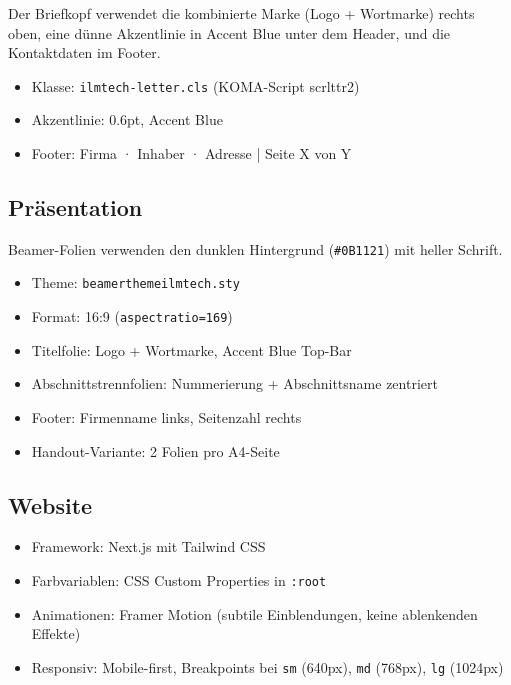 \documentclass[a4paper, 11pt]{article}
\begin{document}
Der Briefkopf verwendet die kombinierte Marke (Logo + Wortmarke) rechts oben, eine dünne
Akzentlinie in Accent Blue unter dem Header, und die Kontaktdaten im Footer.

\begin{itemize}[leftmargin=2em]
  \item Klasse: \texttt{ilmtech-letter.cls} (KOMA-Script scrlttr2)
  \item Akzentlinie: 0.6pt, Accent Blue
  \item Footer: Firma · Inhaber · Adresse | Seite X von Y
\end{itemize}

\subsection{Präsentation}

Beamer-Folien verwenden den dunklen Hintergrund (\texttt{\#0B1121}) mit heller Schrift.

\begin{itemize}[leftmargin=2em]
  \item Theme: \texttt{beamerthemeilmtech.sty}
  \item Format: 16:9 (\texttt{aspectratio=169})
  \item Titelfolie: Logo + Wortmarke, Accent Blue Top-Bar
  \item Abschnittstrennfolien: Nummerierung + Abschnittsname zentriert
  \item Footer: Firmenname links, Seitenzahl rechts
  \item Handout-Variante: 2 Folien pro A4-Seite
\end{itemize}

\subsection{Website}

\begin{itemize}[leftmargin=2em]
  \item Framework: Next.js mit Tailwind CSS
  \item Farbvariablen: CSS Custom Properties in \texttt{:root}
  \item Animationen: Framer Motion (subtile Einblendungen, keine ablenkenden Effekte)
  \item Responsiv: Mobile-first, Breakpoints bei \texttt{sm} (640px), \texttt{md} (768px), \texttt{lg} (1024px)
\end{itemize}
\end{document}
